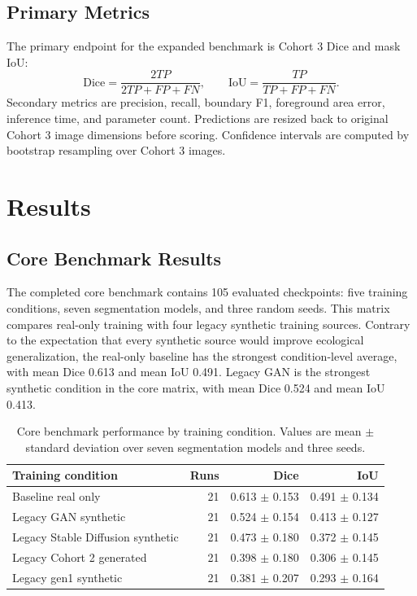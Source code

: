 \documentclass{article}
\begin{document}
\subsection{Primary Metrics}

The primary endpoint for the expanded benchmark is Cohort 3 Dice and mask IoU:
\begin{equation}
\mathrm{Dice} = \frac{2TP}{2TP + FP + FN},
\qquad
\mathrm{IoU} = \frac{TP}{TP + FP + FN}.
\end{equation}
Secondary metrics are precision, recall, boundary F1, foreground area error, inference time, and parameter count. Predictions are resized back to original Cohort 3 image dimensions before scoring. Confidence intervals are computed by bootstrap resampling over Cohort 3 images.

\section{Results}

\subsection{Core Benchmark Results}

The completed core benchmark contains 105 evaluated checkpoints: five training conditions, seven segmentation models, and three random seeds. This matrix compares real-only training with four legacy synthetic training sources. Contrary to the expectation that every synthetic source would improve ecological generalization, the real-only baseline has the strongest condition-level average, with mean Dice 0.613 and mean IoU 0.491. Legacy GAN is the strongest synthetic condition in the core matrix, with mean Dice 0.524 and mean IoU 0.413.

\begin{table}[H]
  \centering
  \caption{Core benchmark performance by training condition. Values are mean $\pm$ standard deviation over seven segmentation models and three seeds.}
  \label{tab:core-condition-results}
  \begin{tabular}{lrrr}
    \toprule
    \textbf{Training condition} & \textbf{Runs} & \textbf{Dice} & \textbf{IoU} \\
    \midrule
    Baseline real only & 21 & 0.613 $\pm$ 0.153 & 0.491 $\pm$ 0.134 \\
    Legacy GAN synthetic & 21 & 0.524 $\pm$ 0.154 & 0.413 $\pm$ 0.127 \\
    Legacy Stable Diffusion synthetic & 21 & 0.473 $\pm$ 0.180 & 0.372 $\pm$ 0.145 \\
    Legacy Cohort 2 generated & 21 & 0.398 $\pm$ 0.180 & 0.306 $\pm$ 0.145 \\
    Legacy gen1 synthetic & 21 & 0.381 $\pm$ 0.207 & 0.293 $\pm$ 0.164 \\
    \bottomrule
  \end{tabular}
\end{table}
\end{document}
